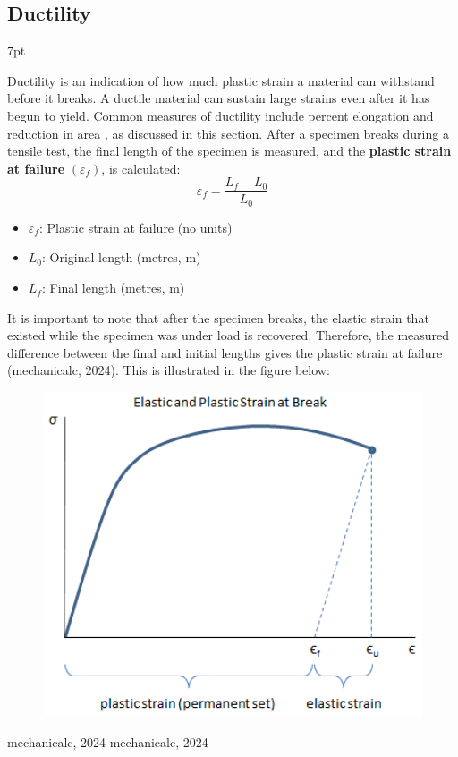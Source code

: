 \documentclass{article}
\newcommand{\formalsource}{} %
\newenvironment{formal}[1][]{%
	\renewcommand{\formalsource}{#1}%
	\def\FrameCommand{%
		\hspace{1pt}%
		{\color{gray}\vrule width 2pt}%
		{\color{white}\vrule width 4pt}%
		\colorbox{white}%
	}%
	\MakeFramed{\advance\hsize-\width\FrameRestore}%
	\noindent\hspace{-4.55pt}%
	\begin{adjustwidth}{}{7pt}%
		\vspace{2pt}%
	}%
	{%
		\vspace{4pt}%
		\ifx\formalsource\empty %
		\else
		\hfill{\footnotesize{\formalsource}}%
		\fi
	\end{adjustwidth}\endMakeFramed%
}
\begin{document}
{\subsection{Ductility}\label{Ductility}
\begin{formal}[mechanicalc, 2024]
Ductility is an indication of how much plastic strain a material can withstand before it breaks. A ductile material can sustain large strains even after it has begun to yield. Common measures of ductility include percent elongation and reduction in area , as discussed in this section.
After a specimen breaks during a tensile test, the final length of the specimen is measured, and the \textbf{plastic strain at failure} $(\varepsilon_f)$, is calculated:
\begin{equation}
    \varepsilon_f = \frac{L_f - L_0}{L_0}
    \label{duc}
\end{equation}
\begin{itemize}[itemsep=-1mm]
    \item $\varepsilon_f$: Plastic strain at failure (no units)
    \item $L_0$: Original length (metres, m)
    \item $L_f$: Final length (metres, m)
\end{itemize}
It is important to note that after the specimen breaks, the elastic strain that existed while the specimen was under load is recovered. Therefore, the measured difference between the final and initial lengths gives the plastic strain at failure (mechanicalc, 2024). This is illustrated in the figure below:\\[8pt]
\begin{minipage}{0.45\textwidth}\centering
    \begin{figure}[H]
    \centering
    \includegraphics[width=1.1\textwidth]{images/elastic-plastic-strain-at-break-01.png}

\end{figure}
\end{minipage}
\end{formal}}
\end{document}
